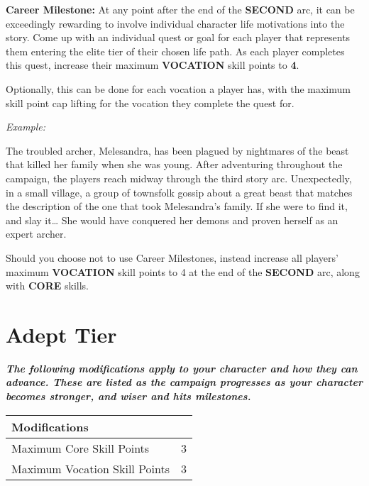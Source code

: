 \textbf{Career Milestone:} At any point after the end of the \textbf{SECOND} arc, it can be exceedingly rewarding to involve individual character life motivations into the story. Come up with an individual quest or goal for each player that represents them entering the elite tier of their chosen life path. As each player completes this quest, increase their maximum \textbf{VOCATION} skill points to \textbf{4}.

Optionally, this can be done for each vocation a player has, with the maximum skill point cap lifting for the vocation they complete the quest for.

\textit{Example:}

\begin{displayquote}
    The troubled archer, Melesandra, has been plagued by nightmares of the beast that killed her family when she was young. After adventuring throughout the campaign, the players reach midway through the third story arc. Unexpectedly, in a small village, a group of townsfolk gossip about a great beast that matches the description of the one that took Melesandra's family. If she were to find it, and slay it… She would have conquered her demons and proven herself as an expert archer.
\end{displayquote}

Should you choose not to use Career Milestones, instead increase all players' maximum \textbf{VOCATION} skill points to 4 at the end of the \textbf{SECOND} arc, along with \textbf{CORE} skills.

\section{Adept Tier}

\textbf{\textit{The following modifications apply to your character and how they can advance. These are listed as the campaign progresses as your character becomes stronger, and wiser and hits milestones.}}

\begin{center}
    \begin{xltabular}{\textwidth}{|l c|} 
        \hline 
        \textbf{Modifications} &  \\
        \hline
        Maximum Core Skill Points & 3 \\
        Maximum Vocation Skill Points & 3 \\
        \hline
    \end{xltabular}
\end{center}

